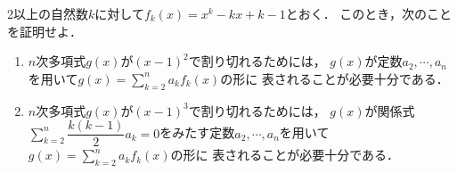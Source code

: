 \documentclass[../../main.tex]{subfiles}
\begin{document}
2以上の自然数$k$に対して$f_k(x)=x^k-kx+k-1$とおく．
このとき，次のことを証明せよ．
\begin{enumerate}
  \item $n$次多項式$g(x)$が$(x-1)^2$で割り切れるためには，
    $g(x)$が定数$a_2,\cdots,a_n$を用いて$\displaystyle g(x)=\sum_{k=2}^n a_k f_k(x)$の形に
    表されることが必要十分である．
  \item $n$次多項式$g(x)$が$(x-1)^3$で割り切れるためには，
    $g(x)$が関係式$\displaystyle \sum_{k=2}^n \dfrac{k(k-1)}{2}a_k=0$をみたす定数$a_2,\cdots,a_n$を用いて
    $\displaystyle g(x)=\sum_{k=2}^n a_k f_k(x)$の形に
    表されることが必要十分である．
\end{enumerate}
\end{document}
